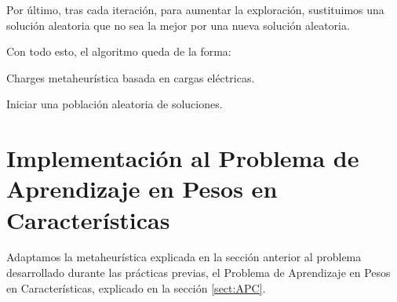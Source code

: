 \documentclass[11pt,a4paper]{article}
\begin{document}
Por último, tras cada iteración, para aumentar la exploración, sustituimos una solución aleatoria que no sea la mejor por una nueva solución aleatoria.

Con todo esto, el algoritmo queda de la forma: \\
\begin{algorithm}[H]
	\caption{{\sc Charges} metaheurística basada en cargas eléctricas.}
	Iniciar una población aleatoria de soluciones. \\
\end{algorithm}

\newpage
\section{Implementación al Problema de Aprendizaje en Pesos en Características}

Adaptamos la metaheurística explicada en la sección anterior al problema desarrollado durante las prácticas previas, el Problema de Aprendizaje en Pesos en Características, explicado en la sección \eqref{sect:APC}.
\end{document}
